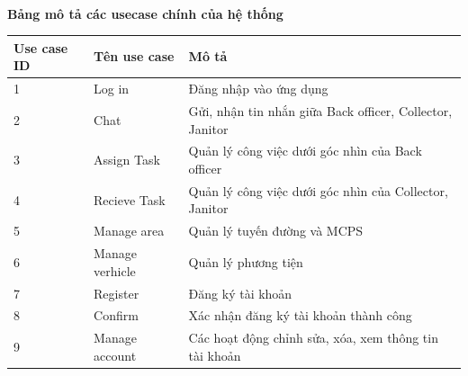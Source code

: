 \documentclass[a4paper]{article}
\begin{document}
\\
\textbf{Bảng mô tả các usecase chính của hệ thống} \\
\begin{tabular}{|p{2cm}|p{4cm}|p{8cm}|}
     \hline
     Use case ID & Tên use case & Mô tả \\
     \hline
     1 & Log in & Đăng nhập vào ứng dụng \\
     \hline
     2 & Chat & Gửi, nhận tin nhắn giữa Back officer, Collector, Janitor \\
     \hline
     3 & Assign Task & Quản lý công việc dưới góc nhìn của  Back officer\\
     \hline
     4  & Recieve Task & Quản lý công việc dưới góc nhìn của   Collector, Janitor \\
     \hline
     5 & Manage area & Quản lý tuyến đường và MCPS \\
     \hline
    6 & Manage verhicle & Quản lý phương tiện  \\
     \hline
    7 & Register & Đăng ký tài khoản  \\
     \hline
    8 & Confirm & Xác nhận đăng ký tài khoản thành công \\
     \hline
   9 & Manage account & Các hoạt động chỉnh sửa, xóa, xem thông tin tài khoản  \\
     \hline
\end{tabular}
\end{document}
